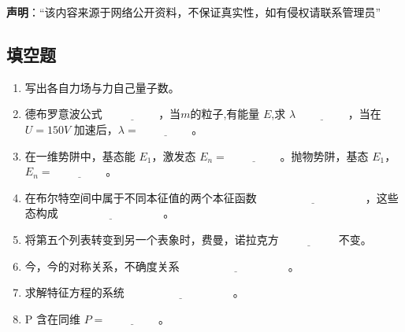 
\textbf{声明}：“该内容来源于网络公开资料，不保证真实性，如有侵权请联系管理员”

\subsection{填空题}
\begin{enumerate}
    \item 写出各自力场与力自己量子数。
    \item 德布罗意波公式 $\underline{\hspace{2cm}}$，当$m$的粒子,有能量 $E$,求 $\lambda\underline{\hspace{2cm}}$，当在 $U = 150V$ 加速后，$\lambda = \underline{\hspace{2cm}}$。
    \item 在一维势阱中，基态能 $E_1$，激发态 $E_n = \underline{\hspace{2cm}}$。抛物势阱，基态 $E_1$，$E_n = \underline{\hspace{2cm}}$。
    \item 在布尔特空间中属于不同本征值的两个本征函数 $\underline{\hspace{4cm}}$，这些态构成$\underline{\hspace{4cm}}$。
    \item 将第五个列表转变到另一个表象时，费曼，诺拉克方 $\underline{\hspace{2cm}}$ 不变。
    \item 今，今的对称关系，不确度关系 $\underline{\hspace{4cm}}$。
    \item 求解特征方程的系统 $\underline{\hspace{4cm}}$。
    \item P 含在同维 $P = \underline{\hspace{2cm}}$。
\end{enumerate}
